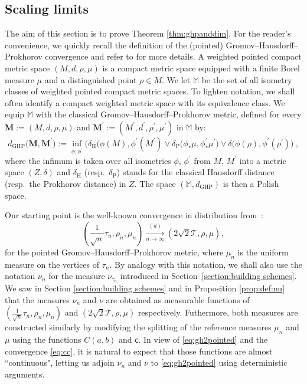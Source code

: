 \documentclass[11pt]{article}
\newcommand{\T}{\mathcal{T}}
\begin{document}
\subsection{Scaling limits}\label{sec:scalinglimitproof}
The aim of this section is to prove Theorem \ref{thm:ghpanddim}. For the reader's convenience, we quickly recall the definition of the (pointed) Gromov--Hausdorff--Prokhorov convergence and  refer to \cite{MR3035742,khezeli2020metrization} for more details. A weighted pointed compact metric space $(M,d,\rho,\mu)$ is a compact metric space equipped with a finite Borel measure $\mu$ and a distinguished point $\rho\in M$. We let $\mathbb{M}$ be the set of all isometry classes of weighted pointed compact metric spaces. To lighten notation, we shall often identify a compact weighted metric space with its equivalence class. We equip $\mathbb{M}$ with the classical Gromov--Hausdorff--Prokhorov metric, defined for every $\textbf{M}:=(M,d, \rho,\mu)$ and  $\textbf{M}^{\prime}:=(M^{\prime},d^{{\prime}},\rho^\prime,\mu^{\prime})$ in $\mathbb{M}$ by:
$$d_{\mathrm{GHP}}\big(\textbf{M},\textbf{M}^{\prime}\big):=\inf\limits_{\phi,\phi^{\prime}}\Big( \delta_{\text{H}}\big(\phi(M),\phi^{\prime}(M^{\prime})\vee \delta_{\text{P}}\big(\phi_* \mu,\phi^{\prime}_* \mu^{\prime}\big)\vee \delta(\phi(\rho),\phi^\prime(\rho^\prime)\Big)~,$$
where the infimum is taken over all isometries $\phi$, $\phi^{\prime}$ from $M$, $M^{\prime}$ into a metric space $(Z, \delta)$ and $\delta_{\text{H}}$ (resp.~$\delta_{\text{P}}$) stands for the classical Hausdorff distance (resp.~the Prokhorov distance) in $Z$. The space $(\mathbb{M},d_{\mathrm{GHP}})$ is then a  Polish space.


Our starting point is the well-known convergence in distribution from~\cite{Ald93}:
\begin{equation}\label{eq:gh2pointed}\left(\frac{1}{\sqrt{n}}\tau_n,\rho_n,\mu_n\right) \underset{n\to\infty}{\overset{(d)}\longrightarrow} (2\sqrt{2}\T,\rho,\mu),
\end{equation}
for the pointed Gromov--Hausdorff--Prokhorov metric, where $\mu_n$ is the uniform measure on the vertices of $\tau_n$. By analogy with this notation, we shall also use the notation $\nu_n$ for the measure $\nu_{\tau_n}$ introduced in Section~\ref{section:building schemes}. We saw in Section \ref{section:building schemes}   and in Proposition \ref{prop:def:nu} that the measures $\nu_n$ and $\nu$ are obtained as measurable functions of $(\frac{1}{\sqrt{n}}\tau_n,\rho_n,\mu_n)$ and $(2\sqrt{2}\T,\rho,\mu)$ respectively. Futhermore, both measures are constructed similarly by modifying the splitting of the reference measures $\mu_n$ and $\mu$ using the functions $C(a,b)$ and $ \mathsf{c}$. In view of \eqref{eq:gh2pointed} and the convergence \eqref{eq:cc}, it is natural to expect that those functions are almost ``continuous", letting us adjoin $\nu_n$ and $\nu$ to \eqref{eq:gh2pointed} using deterministic arguments.\medskip 
\end{document}
